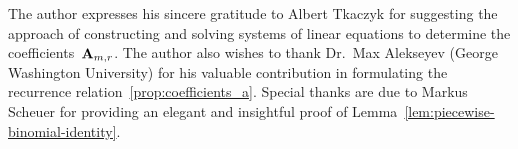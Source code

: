 The author expresses his sincere gratitude to Albert Tkaczyk for suggesting the approach of constructing and solving
systems of linear equations to determine the coefficients~${\mathbf{A}} \sb{m,r}$.
The author also wishes to thank Dr.~Max Alekseyev (George Washington University)
for his valuable contribution in formulating the recurrence relation~\eqref{prop:coefficients_a}.
Special thanks are due to Markus Scheuer for providing an elegant and insightful
proof of Lemma~\eqref{lem:piecewise-binomial-identity}.
